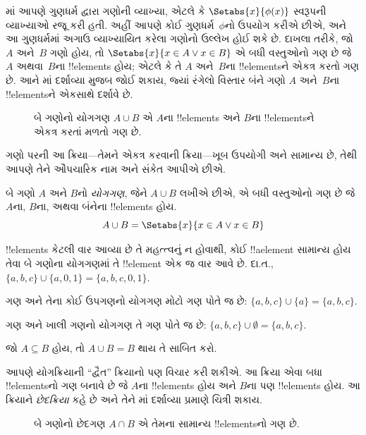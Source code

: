 \documentclass[../../../include/open-logic-section]{subfiles}
\begin{document}

\begin{explain}
માં આપણે ગુણધર્મ દ્વારા ગણોની વ્યાખ્યા,
એટલે કે $\Setabs{x}{\phi(x)}$ સ્વરૂપની વ્યાખ્યાઓ રજૂ કરી હતી.
અહીં આપણે કોઈ ગુણધર્મ~$\phi$નો ઉપયોગ કરીએ છીએ, અને આ ગુણધર્મમાં
અગાઉ વ્યાખ્યાયિત કરેલા ગણોનો ઉલ્લેખ હોઈ શકે છે.
દાખલા તરીકે, જો $A$ અને~$B$ ગણો હોય, તો
$\Setabs{x}{x \in A \lor x \in B}$ એ બધી વસ્તુઓનો ગણ છે જે $A$ અથવા~$B$ના
!!{element}s હોય; એટલે કે તે $A$ અને~$B$ના !!{element}sને એકત્ર કરતો ગણ છે.
આને માં દર્શાવ્યા મુજબ જોઈ શકાય, જ્યાં રંગેલો વિસ્તાર
બંને ગણો $A$ અને~$B$ના !!{element}sને એકસાથે દર્શાવે છે.

\begin{figure}
  \caption{બે ગણોનો યોગગણ $A \cup B$ એ $A$ના !!{element}s અને
  $B$ના !!{element}sને એકત્ર કરતાં મળતો ગણ છે.}
\end{figure}

ગણો પરની આ ક્રિયા---તેમને એકત્ર કરવાની ક્રિયા---ખૂબ ઉપયોગી અને સામાન્ય છે,
તેથી આપણે તેને ઔપચારિક નામ અને સંકેત આપીએ છીએ.
\end{explain}

\begin{defn}[યોગગણ]
બે ગણો $A$ અને $B$નો \emph{યોગગણ}, જેને $A \cup B$ લખીએ છીએ,
એ બધી વસ્તુઓનો ગણ છે જે $A$ના, $B$ના, અથવા બંનેના !!{element}s હોય.
\[
A \cup B = \Setabs{x}{x \in A \lor x \in B}
\]
\end{defn}

\begin{ex}
!!{element}s કેટલી વાર આવ્યા છે તે મહત્ત્વનું ન હોવાથી, કોઈ !!a{element}
સામાન્ય હોય તેવા બે ગણોના યોગગણમાં તે !!{element} એક જ વાર આવે છે.
દા.ત., $\{ a, b, c\} \cup \{ a, 0, 1\} = \{a, b, c, 0, 1\}$.

ગણ અને તેના કોઈ ઉપગણનો યોગગણ મોટો ગણ પોતે જ છે:
$\{a, b, c \} \cup \{a \} = \{a, b, c\}$.

ગણ અને ખાલી ગણનો યોગગણ તે ગણ પોતે જ છે:
$\{a, b, c \} \cup \emptyset = \{a, b, c \}$.
\end{ex}

\begin{prob}
જો $A \subseteq B$ હોય, તો $A \cup B = B$ થાય તે સાબિત કરો.
\end{prob}

\begin{explain}
આપણે યોગક્રિયાની “દ્વૈત” ક્રિયાનો પણ વિચાર કરી શકીએ.
આ ક્રિયા એવા બધા !!{element}sનો ગણ બનાવે છે જે $A$ના !!{element}s
હોય અને $B$ના પણ !!{element}s હોય.
આ ક્રિયાને \emph{છેદક્રિયા} કહે છે અને તેને માં
દર્શાવ્યા પ્રમાણે ચિત્રી શકાય.
\begin{figure}
  \caption{બે ગણોનો છેદગણ $A \cap B$ એ તેમના સામાન્ય !!{element}sનો ગણ છે.}
\end{figure}
\end{explain}
\end{document}
